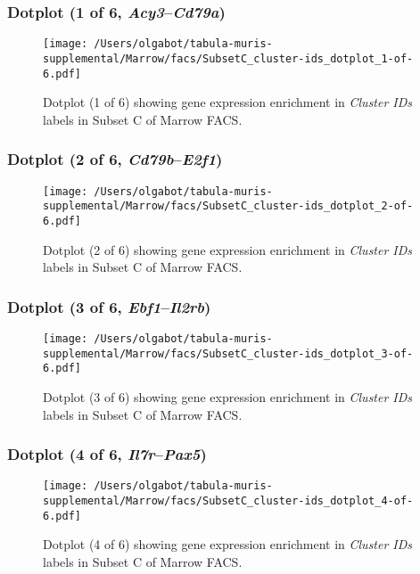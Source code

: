 \clearpage

\subsubsection{Dotplot (1 of 6, \emph{Acy3}--\emph{Cd79a})}
\begin{figure}[h]
\centering
\texttt{[image: /Users/olgabot/tabula-muris-supplemental/Marrow/facs/SubsetC\_cluster-ids\_dotplot\_1-of-6.pdf]}

\caption{ Dotplot (1 of 6)  showing gene expression enrichment in \emph{Cluster IDs} labels in Subset C of Marrow FACS. }
\end{figure}


\clearpage

\subsubsection{Dotplot (2 of 6, \emph{Cd79b}--\emph{E2f1})}
\begin{figure}[h]
\centering
\texttt{[image: /Users/olgabot/tabula-muris-supplemental/Marrow/facs/SubsetC\_cluster-ids\_dotplot\_2-of-6.pdf]}

\caption{ Dotplot (2 of 6)  showing gene expression enrichment in \emph{Cluster IDs} labels in Subset C of Marrow FACS. }
\end{figure}


\clearpage

\subsubsection{Dotplot (3 of 6, \emph{Ebf1}--\emph{Il2rb})}
\begin{figure}[h]
\centering
\texttt{[image: /Users/olgabot/tabula-muris-supplemental/Marrow/facs/SubsetC\_cluster-ids\_dotplot\_3-of-6.pdf]}

\caption{ Dotplot (3 of 6)  showing gene expression enrichment in \emph{Cluster IDs} labels in Subset C of Marrow FACS. }
\end{figure}


\clearpage

\subsubsection{Dotplot (4 of 6, \emph{Il7r}--\emph{Pax5})}
\begin{figure}[h]
\centering
\texttt{[image: /Users/olgabot/tabula-muris-supplemental/Marrow/facs/SubsetC\_cluster-ids\_dotplot\_4-of-6.pdf]}

\caption{ Dotplot (4 of 6)  showing gene expression enrichment in \emph{Cluster IDs} labels in Subset C of Marrow FACS. }
\end{figure}



